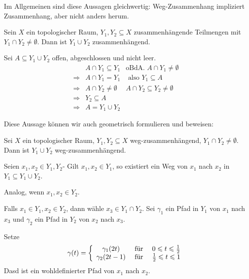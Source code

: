 \documentclass[main.tex]{subfiles}
\begin{document}
\begin{Bemerkung}
  Im Allgemeinen sind diese Aussagen  gleichwertig: Weg-Zusammenhang impliziert Zusammenhang, aber nicht anders herum.
\end{Bemerkung}

\begin{Theorem}
  Sein $X$ ein topologischer Raum, $Y_1, Y_2 \subseteq X$ zusammenhängende Teilmengen mit $Y_1 \cap Y_2 \neq \emptyset$. Dann ist $Y_1 \cup Y_2$ zusammenhängend.
\end{Theorem}

\begin{Beweis}
  Sei $A \subseteq Y_1 \cup Y_2$ offen, abgeschlossen und nicht leer.
  $$\begin{aligned}
    & A \cap Y_1 \subseteq Y_1 & \text{oBdA. } A \cap Y_1 \neq \emptyset \\
    \Rightarrow & A \cap Y_1 = Y_1  & \text{ also } Y_1 \subseteq A \\
    \Rightarrow & A \cap Y_2 \neq \emptyset & A \cap Y_2 \subseteq Y_2 \neq \emptyset \\
    \Rightarrow & Y_2 \subseteq A & \\
    \Rightarrow & A = Y_1 \cup Y_2 &
  \end{aligned}$$
\end{Beweis}

Diese Aussage können wir auch geometrisch formulieren und beweisen:

\begin{Theorem}
  Sei $X$ ein topologischer Raum, $Y_1, Y_2 \subseteq X$ weg-zusammenhängend, $Y_1 \cap Y_2 \neq \emptyset$. Dann ist $Y_1 \cup Y_2$ weg-zusammenhängend.
\end{Theorem}

\begin{Beweis}
  Seien $x_1, x_2 \in Y_1, Y_2$- Gilt $x_1,x_2 \in Y_1$, so existiert ein Weg von $x_1$ nach $x_2$ in $Y_1 \subseteq Y_1 \cup Y_2$.

  Analog, wenn $x_1, x_2 \in Y_2$.

  Falls $x_1 \in Y_1, x_2 \in Y_2$, dann wähle $x_3 \in Y_1 \cap Y_2$. Sei $\gamma_1$ ein Pfad in $Y_1$ von $x_1$ nach $x_3$ und $\gamma_2$ ein Pfad in $Y_2$ von $x_2$ nach $x_3$.

  Setze
  $$ \gamma(t) = \left\{ \begin{array}{c c c}
    \gamma_1(2t) & \text{ für } & 0 \leq t \leq \frac{1}{2} \\
    \gamma_2(2t - 1) & \text{ für } & \frac{1}{2} \leq t \leq 1
  \end{array}\right.$$
  Dasd ist ein wohldefinierter Pfad von $x_1$ nach $x_2$.
\end{Beweis}
\end{document}
